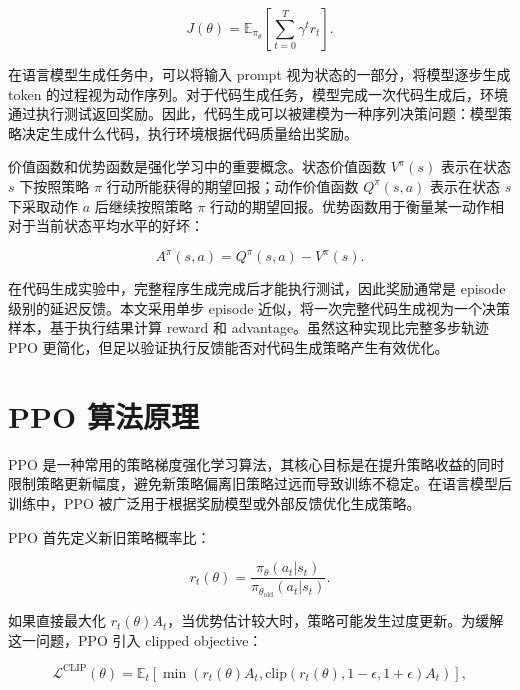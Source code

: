 \begin{equation}
  J(\theta)=\mathbb{E}_{\pi_{\theta}}\left[\sum_{t=0}^{T}\gamma^t r_t\right].
\end{equation}

在语言模型生成任务中，可以将输入 prompt 视为状态的一部分，将模型逐步生成 token 的过程视为动作序列。对于代码生成任务，模型完成一次代码生成后，环境通过执行测试返回奖励。因此，代码生成可以被建模为一种序列决策问题：模型策略决定生成什么代码，执行环境根据代码质量给出奖励。

价值函数和优势函数是强化学习中的重要概念。状态价值函数 $V^{\pi}(s)$ 表示在状态 $s$ 下按照策略 $\pi$ 行动所能获得的期望回报；动作价值函数 $Q^{\pi}(s,a)$ 表示在状态 $s$ 下采取动作 $a$ 后继续按照策略 $\pi$ 行动的期望回报。优势函数用于衡量某一动作相对于当前状态平均水平的好坏：

\begin{equation}
  A^{\pi}(s,a)=Q^{\pi}(s,a)-V^{\pi}(s).
\end{equation}

在代码生成实验中，完整程序生成完成后才能执行测试，因此奖励通常是 episode 级别的延迟反馈。本文采用单步 episode 近似，将一次完整代码生成视为一个决策样本，基于执行结果计算 reward 和 advantage。虽然这种实现比完整多步轨迹 PPO 更简化，但足以验证执行反馈能否对代码生成策略产生有效优化。

\section{PPO 算法原理}

PPO 是一种常用的策略梯度强化学习算法，其核心目标是在提升策略收益的同时限制策略更新幅度，避免新策略偏离旧策略过远而导致训练不稳定\cite{Schulman2017PPO}。在语言模型后训练中，PPO 被广泛用于根据奖励模型或外部反馈优化生成策略。

PPO 首先定义新旧策略概率比：

\begin{equation}
  r_t(\theta)=\frac{\pi_{\theta}(a_t|s_t)}{\pi_{\theta_{\mathrm{old}}}(a_t|s_t)}.
\end{equation}

如果直接最大化 $r_t(\theta)A_t$，当优势估计较大时，策略可能发生过度更新。为缓解这一问题，PPO 引入 clipped objective：

\begin{equation}
  \mathcal{L}^{\mathrm{CLIP}}(\theta)
  = \mathbb{E}_t
  \left[
  \min
  \left(
  r_t(\theta)A_t,
  \mathrm{clip}(r_t(\theta),1-\epsilon,1+\epsilon)A_t
  \right)
  \right],
\end{equation}

